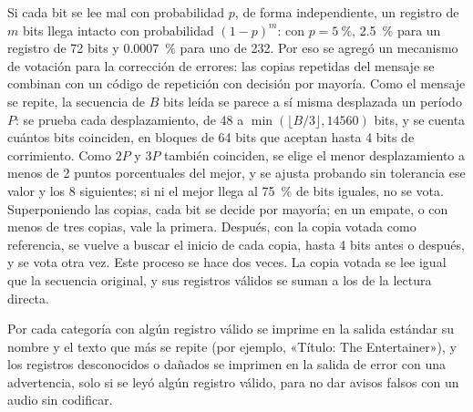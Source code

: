 Si cada bit se lee mal con probabilidad $p$, de forma independiente, un registro de $m$ bits llega intacto con probabilidad $(1-p)^m$: con $p = \SI{5}{\percent}$, \SI{2.5}{\percent} para un registro de 72 bits y \SI{0.0007}{\percent} para uno de 232. Por eso se agregó un mecanismo de votación para la corrección de errores: las copias repetidas del mensaje se combinan con un código de repetición con decisión por mayoría. Como el mensaje se repite, la secuencia de $B$ bits leída se parece a sí misma desplazada un período $P$: se prueba cada desplazamiento, de 48 a $\min(\lfloor B/3\rfloor,14560)$ bits, y se cuenta cuántos bits coinciden, en bloques de 64 bits que aceptan hasta 4 bits de corrimiento. Como $2P$ y $3P$ también coinciden, se elige el menor desplazamiento a menos de 2 puntos porcentuales del mejor, y se ajusta probando sin tolerancia ese valor y los 8 siguientes; si ni el mejor llega al \SI{75}{\percent} de bits iguales, no se vota. Superponiendo las copias, cada bit se decide por mayoría; en un empate, o con menos de tres copias, vale la primera. Después, con la copia votada como referencia, se vuelve a buscar el inicio de cada copia, hasta 4 bits antes o después, y se vota otra vez. Este proceso se hace dos veces. La copia votada se lee igual que la secuencia original, y sus registros válidos se suman a los de la lectura directa.

Por cada categoría con algún registro válido se imprime en la salida estándar su nombre y el texto que más se repite (por ejemplo, «Título: The Entertainer»), y los registros desconocidos o dañados se imprimen en la salida de error con una advertencia, solo si se leyó algún registro válido, para no dar avisos falsos con un audio sin codificar.
